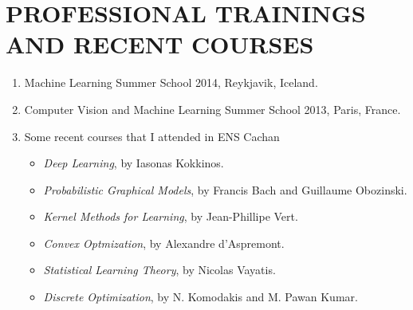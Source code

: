\documentclass{res}
\begin{document}
\begin{resume}
\begin{enumerate}
        \end{enumerate}       



        \section{PROFESSIONAL TRAININGS AND RECENT COURSES}  
        \begin{enumerate}
        \item Machine Learning Summer School 2014, Reykjavik, Iceland.
        \item Computer Vision and Machine Learning Summer School 2013, Paris, France.
        \item Some recent courses that I attended in ENS Cachan
        \begin{itemize}
        \item \emph{Deep Learning}, by Iasonas Kokkinos. 
        \item \emph{Probabilistic Graphical Models}, by Francis Bach and Guillaume Obozinski.
        \item \emph{Kernel Methods for Learning}, by Jean-Phillipe Vert.
        \item \emph{Convex Optmization}, by Alexandre d'Aspremont.
        \item \emph{Statistical Learning Theory}, by Nicolas Vayatis. 
        \item \emph{Discrete Optimization}, by N. Komodakis and M. Pawan Kumar. 
        \end{itemize}
        \end{enumerate}        


\end{resume}
\end{document}
